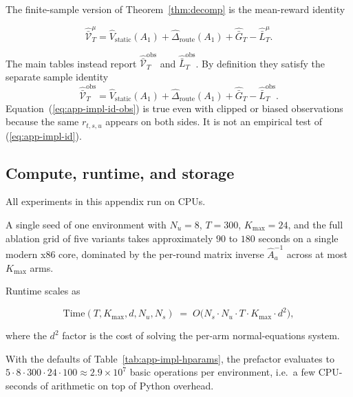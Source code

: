 \documentclass{article} %
\renewcommand{\eqref}[1]{\textup{(\ref{#1})}}
\begin{document}
The finite-sample version of Theorem~\ref{thm:decomp} is the mean-reward identity

\begin{equation}
\label{eq:app-impl-id}
\widehat{\bar{\mathcal V}}_T^\mu
=
\widehat V_{\mathrm{static}}(A_1)
+\widehat\Delta_{\mathrm{route}}(A_1)
+\widehat{\bar G}_T
-\widehat{\bar L}_T^\mu.
\end{equation}

The main tables instead report
\(\widehat{\bar{\mathcal V}}_T^{\mathrm{obs}}\) and
\(\widehat{\bar L}_T^{\mathrm{obs}}\). By definition they satisfy the separate
sample identity
\begin{equation}
\label{eq:app-impl-id-obs}
\widehat{\bar{\mathcal V}}_T^{\mathrm{obs}}
=
\widehat V_{\mathrm{static}}(A_1)
+\widehat\Delta_{\mathrm{route}}(A_1)
+\widehat{\bar G}_T
-\widehat{\bar L}_T^{\mathrm{obs}}.
\end{equation}
Equation~\eqref{eq:app-impl-id-obs} is true even with clipped or biased
observations because the same \(r_{t,s,u}\) appears on both sides. It is not an
empirical test of \eqref{eq:app-impl-id}.

\subsection{Compute, runtime, and storage}

\label{app:impl-compute}

All experiments in this appendix run on CPUs.

A single seed of one environment with $N_u = 8$, $T = 300$, $K_{\max} = 24$, and the full ablation grid of five variants takes approximately $90$ to $180$ seconds on a single modern x86 core, dominated by the per-round matrix inverse $\widehat{A}_a^{-1}$ across at most $K_{\max}$ arms.

Runtime scales as

\begin{equation}
\label{eq:app-impl-runtime}
\mathrm{Time}(T, K_{\max}, d, N_u, N_s) \;=\; O\big(N_s \cdot N_u \cdot T \cdot K_{\max} \cdot d^2\big),
\end{equation}

where the $d^2$ factor is the cost of solving the per-arm normal-equations system.

With the defaults of Table~\ref{tab:app-impl-hparams}, the prefactor evaluates to $5 \cdot 8 \cdot 300 \cdot 24 \cdot 100 \approx 2.9 \times 10^7$ basic operations per environment, i.e.\ a few CPU-seconds of arithmetic on top of Python overhead.
\end{document}
